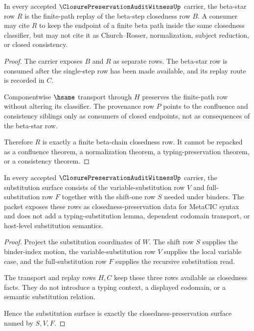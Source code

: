 \begin{theorem}
\label{thm:closure-preservation-audit-witness-beta-star-row}
In every accepted $\ClosurePreservationAuditWitnessUp$ carrier, the beta-star row $R$ is the finite-path replay of the beta-step closedness row $B$. A consumer may cite $R$ to keep the endpoint of a finite beta path inside the same closedness classifier, but may not cite it as Church--Rosser, normalization, subject reduction, or closed consistency.
\end{theorem}
\begin{proof}
The carrier exposes $B$ and $R$ as separate rows. The beta-star row is consumed after the single-step row has been made available, and its replay route is recorded in $C$.

Componentwise $\hsame$ transport through $H$ preserves the finite-path row without altering its classifier. The provenance row $P$ points to the confluence and consistency siblings only as consumers of closed endpoints, not as consequences of the beta-star row.

Therefore $R$ is exactly a finite beta-chain closedness row. It cannot be repacked as a confluence theorem, a normalization theorem, a typing-preservation theorem, or a consistency theorem.
\end{proof}

\begin{theorem}
\label{thm:closure-preservation-audit-witness-substitution-row}
In every accepted $\ClosurePreservationAuditWitnessUp$ carrier, the substitution surface consists of the variable-substitution row $V$ and full-substitution row $F$ together with the shift-one row $S$ needed under binders. The packet exposes these rows as closedness-preservation data for MetaCIC syntax and does not add a typing-substitution lemma, dependent codomain transport, or host-level substitution semantics.
\end{theorem}
\begin{proof}
Project the substitution coordinates of $W$. The shift row $S$ supplies the binder-index motion, the variable-substitution row $V$ supplies the local variable case, and the full-substitution row $F$ supplies the recursive substitution read.

The transport and replay rows $H,C$ keep these three rows available as closedness facts. They do not introduce a typing context, a displayed codomain, or a semantic substitution relation.

Hence the substitution surface is exactly the closedness-preservation surface named by $S,V,F$.
\end{proof}

